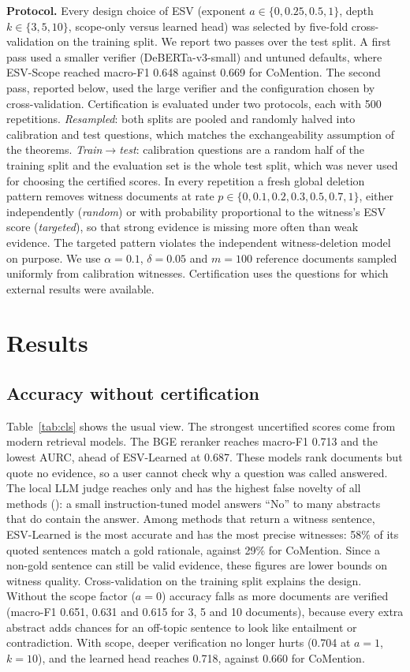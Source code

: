 \documentclass[conference,a4paper]{IEEEtran}
\theoremstyle{definition}
\begin{document}
\textbf{Protocol.} Every design choice of ESV (exponent $a\in\{0,0.25,0.5,1\}$, depth $k\in\{3,5,10\}$, scope-only versus learned head) was selected by five-fold cross-validation on the training split. We report two passes over the test split. A first pass used a smaller verifier (DeBERTa-v3-small) and untuned defaults, where ESV-Scope reached macro-F1 0.648 against 0.669 for CoMention. The second pass, reported below, used the large verifier and the configuration chosen by cross-validation. Certification is evaluated under two protocols, each with 500 repetitions. \emph{Resampled}: both splits are pooled and randomly halved into calibration and test questions, which matches the exchangeability assumption of the theorems. \emph{Train$\to$test}: calibration questions are a random half of the training split and the evaluation set is the whole test split, which was never used for choosing the certified scores. In every repetition a fresh global deletion pattern removes witness documents at rate $p\in\{0,0.1,0.2,0.3,0.5,0.7,1\}$, either independently (\emph{random}) or with probability proportional to the witness's ESV score (\emph{targeted}), so that strong evidence is missing more often than weak evidence. The targeted pattern violates the independent witness-deletion model on purpose. We use $\alpha=0.1$, $\delta=0.05$ and $m=100$ reference documents sampled uniformly from calibration witnesses. Certification uses the \Nquestions{} questions for which external results were available.

\section{Results}
\subsection{Accuracy without certification}
Table~\ref{tab:cls} shows the usual view. The strongest uncertified scores come from modern retrieval models. The BGE reranker reaches macro-F1 0.713 and the lowest AURC, ahead of ESV-Learned at 0.687. These models rank documents but quote no evidence, so a user cannot check why a question was called answered. The local LLM judge reaches only \LLMfone{} and has the highest false novelty of all methods (\LLMfn{}): a small instruction-tuned model answers ``No'' to many abstracts that do contain the answer. Among methods that return a witness sentence, ESV-Learned is the most accurate and has the most precise witnesses: 58\% of its quoted sentences match a gold rationale, against 29\% for CoMention. Since a non-gold sentence can still be valid evidence, these figures are lower bounds on witness quality. Cross-validation on the training split explains the design. Without the scope factor ($a=0$) accuracy falls as more documents are verified (macro-F1 0.651, 0.631 and 0.615 for 3, 5 and 10 documents), because every extra abstract adds chances for an off-topic sentence to look like entailment or contradiction. With scope, deeper verification no longer hurts (0.704 at $a=1$, $k=10$), and the learned head reaches 0.718, against 0.660 for CoMention.
\end{document}
